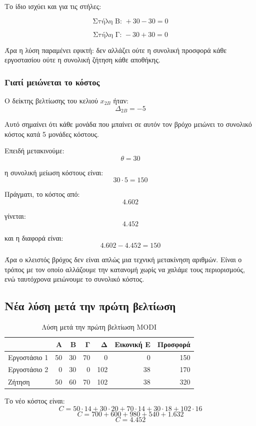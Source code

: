 \documentclass[12pt,a4paper]{article}
\begin{document}
Το ίδιο ισχύει και για τις στήλες:

\[
\text{Στήλη Β: } +30-30=0
\]

\[
\text{Στήλη Γ: } -30+30=0
\]

Άρα η λύση παραμένει εφικτή: δεν αλλάζει ούτε η συνολική προσφορά κάθε εργοστασίου ούτε η συνολική ζήτηση κάθε αποθήκης.

\subsubsection*{Γιατί μειώνεται το κόστος}

Ο δείκτης βελτίωσης του κελιού \(x_{2B}\) ήταν:
\[
\Delta_{2B}=-5
\]

Αυτό σημαίνει ότι κάθε μονάδα που μπαίνει σε αυτόν τον βρόχο μειώνει το συνολικό κόστος κατά 5 μονάδες κόστους.

Επειδή μετακινούμε:
\[
\theta=30
\]

η συνολική μείωση κόστους είναι:
\[
30\cdot5=150
\]

Πράγματι, το κόστος από:
\[
4.602
\]

γίνεται:
\[
4.452
\]

και η διαφορά είναι:
\[
4.602-4.452=150
\]

Άρα ο κλειστός βρόχος δεν είναι απλώς μια τεχνική μετακίνηση αριθμών. Είναι ο τρόπος με τον οποίο αλλάζουμε την κατανομή χωρίς να χαλάμε τους περιορισμούς, ενώ ταυτόχρονα μειώνουμε το συνολικό κόστος.

\subsection{Νέα λύση μετά την πρώτη βελτίωση}

\begin{table}[H]
\centering
\caption{Λύση μετά την πρώτη βελτίωση MODI}
\small
\begin{tabular}{lrrrrrr}
\toprule
 & \textbf{Α} & \textbf{Β} & \textbf{Γ} & \textbf{Δ} & \textbf{Εικονική Ε} & \textbf{Προσφορά} \\
\midrule
Εργοστάσιο 1 & 50 & 30 & 70 & 0 & 0 & 150 \\
Εργοστάσιο 2 & 0 & 30 & 0 & 102 & 38 & 170 \\
\midrule
Ζήτηση & 50 & 60 & 70 & 102 & 38 & 320 \\
\bottomrule
\end{tabular}
\end{table}

Το νέο κόστος είναι:
\[
C=50\cdot14+30\cdot20+70\cdot14+30\cdot18+102\cdot16
\]
\[
C=700+600+980+540+1.632
\]
\[
\boxed{C=4.452}
\]
\end{document}
